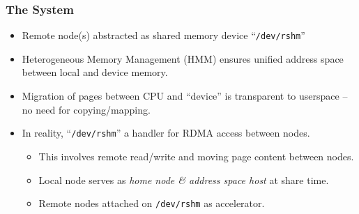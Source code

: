 \documentclass{beamer}
\begin{document}
\begin{frame}
    \frametitle{The System}
    \begin{itemize}
        \item Remote node(s) abstracted as shared memory device ``\texttt{/dev/rshm}''
        \item {
            Heterogeneous Memory Management (HMM) ensures unified address space between
            local and device memory.
        }
        \item {
            Migration of pages between CPU and ``device'' is transparent to userspace
            -- no need for copying/mapping.
        }
        \item {
            In reality, ``\texttt{/dev/rshm}'' a handler for RDMA access between nodes.
            \begin{itemize}
                \item This involves remote read/write and moving page content between nodes.
                \item Local node serves as \emph{home node \& address space host} at share time.
                \item Remote nodes attached on \texttt{/dev/rshm} as accelerator.
            \end{itemize}
        }
    \end{itemize}
\end{frame}
\end{document}
